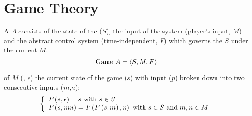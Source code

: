 \chapter{Game Theory}

\begin{defi}
A  $A$ consists of the state of the  ($S$), the input of the system (player's input, $M$) and the abstract control system (time-independent, $F$) which governs the $S$ under the current $M$:
\begin{equation}
\mbox{Game }A=\left\langle S,M,F\right\rangle
\end{equation}
\cite{journals/procedia/KosmadoudiLRSLSS12}
\end{defi}

\begin{defi}
 of $M$ (, $\epsilon$) the current state of the game ($s$) with input ($p$) broken down into two consecutive inputs ($m$,$n$):
\begin{equation}
\left\{\begin{array}{l}
F\left(s,\epsilon\right)=s\mbox{ with }s\in S\\
F\left(s,mn\right)=F\left(F\left(s,m\right),n\right)\mbox{ with } s\in S\mbox{ and }m,n\in M
\end{array}\right.
\end{equation}
\cite{journals/procedia/KosmadoudiLRSLSS12}
\end{defi}